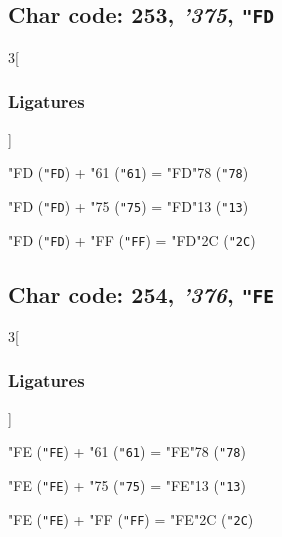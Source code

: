 \documentclass{article}
\newlength{\maxcharwidth}
\begin{document}
\subsection{Char code: 253, {\it'375}, {\tt"FD}}
\label{char_253}


\begin{multicols}{3}[\subsubsection{Ligatures}]

{\testfont\char"FD\noboundary} ({\tt"FD}) + {\testfont\char"61\noboundary} ({\tt"61}) = {\testfont\char"FD\noboundary}{\testfont\char"78\noboundary} ({\tt"78}) 

{\testfont\char"FD\noboundary} ({\tt"FD}) + {\testfont\char"75\noboundary} ({\tt"75}) = {\testfont\char"FD\noboundary}{\testfont\char"13\noboundary} ({\tt"13}) 

{\testfont\char"FD\noboundary} ({\tt"FD}) + {\testfont\char"FF\noboundary} ({\tt"FF}) = {\testfont\char"FD\noboundary}{\testfont\char"2C\noboundary} ({\tt"2C}) 

\end{multicols}

\subsection{Char code: 254, {\it'376}, {\tt"FE}}
\label{char_254}


\begin{multicols}{3}[\subsubsection{Ligatures}]

{\testfont\char"FE\noboundary} ({\tt"FE}) + {\testfont\char"61\noboundary} ({\tt"61}) = {\testfont\char"FE\noboundary}{\testfont\char"78\noboundary} ({\tt"78}) 

{\testfont\char"FE\noboundary} ({\tt"FE}) + {\testfont\char"75\noboundary} ({\tt"75}) = {\testfont\char"FE\noboundary}{\testfont\char"13\noboundary} ({\tt"13}) 

{\testfont\char"FE\noboundary} ({\tt"FE}) + {\testfont\char"FF\noboundary} ({\tt"FF}) = {\testfont\char"FE\noboundary}{\testfont\char"2C\noboundary} ({\tt"2C}) 

\end{multicols}
\end{document}
